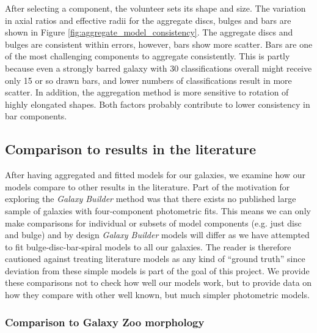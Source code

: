 \documentclass[trackchanges]{aastex63}
\begin{document}
After selecting a component, the volunteer sets its shape and size. The variation in axial ratios and effective radii for the aggregate discs, bulges and bars are shown in Figure \ref{fig:aggregate_model_consistency}. The aggregate discs and bulges are consistent within errors, however, bars show more scatter. Bars are one of the most challenging components to aggregate consistently. This is partly because even a strongly barred galaxy with 30 classifications overall might receive only 15 or so drawn bars, and lower numbers of classifications result in more scatter. In addition, the aggregation method is more sensitive to rotation of highly elongated shapes. Both factors probably contribute to lower consistency in bar components.

\begin{figure*}
  \caption{Comparison of component shape in aggregate models between the original and validation sets. Errors are obtained through the sample variance of clustered components, as detailed in Section \ref{sec:error_estimation}. We see close agreement between aggregate components from the two sets, suggesting that the clustering method is robust to the scatter in classifications.}
  \label{fig:aggregate_model_consistency}
\end{figure*}

\subsection{Comparison to results in the literature}

After having aggregated and fitted models for our galaxies, we examine how our models compare to other results in the literature. Part of the motivation for exploring the \textit{Galaxy Builder} method was that there exists no published large sample of galaxies with four-component photometric fits. This means we can only make comparisons for individual or subsets of model components (e.g. just disc and bulge) and by design \textit{Galaxy Builder} models will differ as we have attempted to fit bulge-disc-bar-spiral models to all our galaxies. The reader is therefore cautioned against treating literature models as any kind of ``ground truth'' since deviation from these simple models is part of the goal of this project. We provide these comparisons not to check how well our models work, but to provide data on how they compare with other well known, but much simpler photometric models.

\subsubsection{Comparison to Galaxy Zoo morphology}
\end{document}
